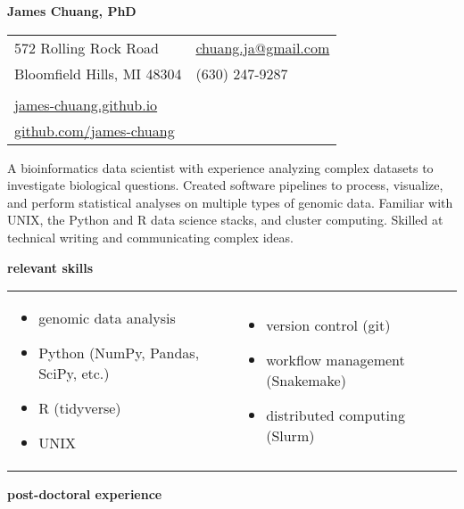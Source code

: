 \documentclass[11pt, a4paper]{article}
\begin{document}
\textbf{\LARGE James Chuang, PhD} \\

\begin{tabularx}{9.8cm}{@{}Xl}
    572 Rolling Rock Road & \href{mailto:chuang.ja@gmail.com}{chuang.ja@gmail.com} \\
    Bloomfield Hills, MI 48304 & (630) 247-9287 \\
    \\
    \href{https://james-chuang.github.io}{james-chuang.github.io} \\
    \href{https://github.com/james-chuang}{github.com/james-chuang} \\
\end{tabularx}

\vspace{1em}
\noindent\hrulefill
\vspace{1em}

A bioinformatics data scientist with experience analyzing complex datasets to investigate biological questions.
Created software pipelines to process, visualize, and perform statistical analyses on multiple types of genomic data.
Familiar with UNIX, the Python and R data science stacks, and cluster computing.
Skilled at technical writing and communicating complex ideas.

\vspace{1em}
\textbf{\Large relevant skills}

\begin{tabularx}{0.95\textwidth}{XX}
    \begin{itemize}[topsep=0pt, itemsep=-3pt]
        \item genomic data analysis
        \item Python (NumPy, Pandas, SciPy, etc.)
        \item R (tidyverse)
        \item UNIX
    \end{itemize} &
    \begin{itemize}[topsep=0pt, itemsep=-3pt]
        \item version control (git)
        \item workflow management (Snakemake)
        \item distributed computing (Slurm)
    \end{itemize} \\
\end{tabularx}

\textbf{\Large post-doctoral experience}
\end{document}
